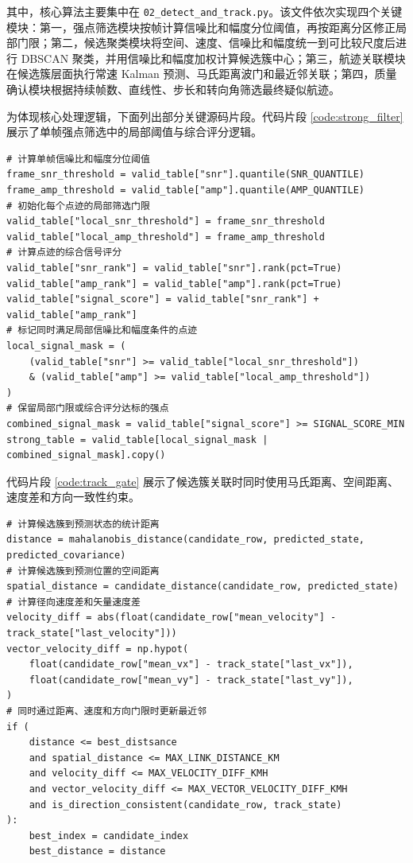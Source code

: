 \documentclass[UTF8,a4paper,12pt]{ctexart}
\numberwithin{figure}{section}
\numberwithin{table}{section}
\begin{document}
其中，核心算法主要集中在 \texttt{02\_detect\_and\_track.py}。该文件依次实现四个关键模块：第一，强点筛选模块按帧计算信噪比和幅度分位阈值，再按距离分区修正局部门限；第二，候选聚类模块将空间、速度、信噪比和幅度统一到可比较尺度后进行 DBSCAN 聚类，并用信噪比和幅度加权计算候选簇中心；第三，航迹关联模块在候选簇层面执行常速 Kalman 预测、马氏距离波门和最近邻关联；第四，质量确认模块根据持续帧数、直线性、步长和转向角筛选最终疑似航迹。

为体现核心处理逻辑，下面列出部分关键源码片段。代码片段 \ref{code:strong_filter} 展示了单帧强点筛选中的局部阈值与综合评分逻辑。

\begin{lstlisting}[style=PythonStyle,caption={强点筛选核心代码},label={code:strong_filter}]
# 计算单帧信噪比和幅度分位阈值
frame_snr_threshold = valid_table["snr"].quantile(SNR_QUANTILE)
frame_amp_threshold = valid_table["amp"].quantile(AMP_QUANTILE)
# 初始化每个点迹的局部筛选门限
valid_table["local_snr_threshold"] = frame_snr_threshold
valid_table["local_amp_threshold"] = frame_amp_threshold
# 计算点迹的综合信号评分
valid_table["snr_rank"] = valid_table["snr"].rank(pct=True)
valid_table["amp_rank"] = valid_table["amp"].rank(pct=True)
valid_table["signal_score"] = valid_table["snr_rank"] + valid_table["amp_rank"]
# 标记同时满足局部信噪比和幅度条件的点迹
local_signal_mask = (
    (valid_table["snr"] >= valid_table["local_snr_threshold"])
    & (valid_table["amp"] >= valid_table["local_amp_threshold"])
)
# 保留局部门限或综合评分达标的强点
combined_signal_mask = valid_table["signal_score"] >= SIGNAL_SCORE_MIN
strong_table = valid_table[local_signal_mask | combined_signal_mask].copy()
\end{lstlisting}

代码片段 \ref{code:track_gate} 展示了候选簇关联时同时使用马氏距离、空间距离、速度差和方向一致性约束。

\begin{lstlisting}[style=PythonStyle,caption={候选簇关联门限代码},label={code:track_gate}]
# 计算候选簇到预测状态的统计距离
distance = mahalanobis_distance(candidate_row, predicted_state, predicted_covariance)
# 计算候选簇到预测位置的空间距离
spatial_distance = candidate_distance(candidate_row, predicted_state)
# 计算径向速度差和矢量速度差
velocity_diff = abs(float(candidate_row["mean_velocity"] - track_state["last_velocity"]))
vector_velocity_diff = np.hypot(
    float(candidate_row["mean_vx"] - track_state["last_vx"]),
    float(candidate_row["mean_vy"] - track_state["last_vy"]),
)
# 同时通过距离、速度和方向门限时更新最近邻
if (
    distance <= best_distsance
    and spatial_distance <= MAX_LINK_DISTANCE_KM
    and velocity_diff <= MAX_VELOCITY_DIFF_KMH
    and vector_velocity_diff <= MAX_VECTOR_VELOCITY_DIFF_KMH
    and is_direction_consistent(candidate_row, track_state)
):
    best_index = candidate_index
    best_distance = distance
\end{lstlisting}
\end{document}
